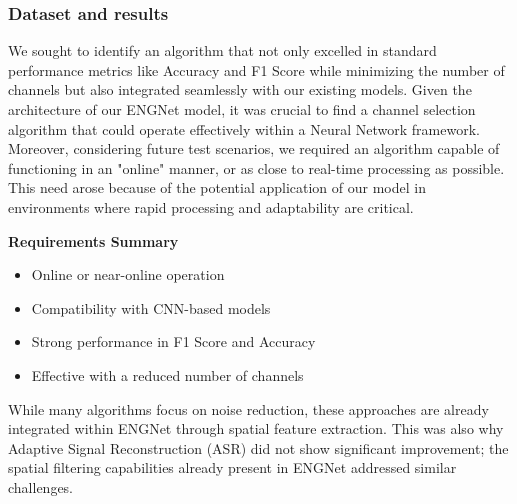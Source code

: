 \documentclass{Configuration_Files/PoliMi3i_thesis}
\begin{document}



\subsubsection{Dataset and results}


We sought to identify an algorithm that not only excelled in standard performance metrics like Accuracy and F1 Score while minimizing the number of channels but also integrated seamlessly with our existing models. Given the architecture of our ENGNet model, it was crucial to find a channel selection algorithm that could operate effectively within a Neural Network framework.
Moreover, considering future test scenarios, we required an algorithm capable of functioning in an "online" manner, or as close to real-time processing as possible. This need arose because of the potential application of our model in environments where rapid processing and adaptability are critical.

\textbf{Requirements Summary}
\begin{itemize}
    \item Online or near-online operation
    \item Compatibility with CNN-based models
    \item Strong performance in F1 Score and Accuracy
    \item Effective with a reduced number of channels
\end{itemize}

While many algorithms focus on noise reduction, these approaches are already integrated within ENGNet through spatial feature extraction. This was also why Adaptive Signal Reconstruction (ASR) did not show significant improvement; the spatial filtering capabilities already present in ENGNet addressed similar challenges.
\end{document}
